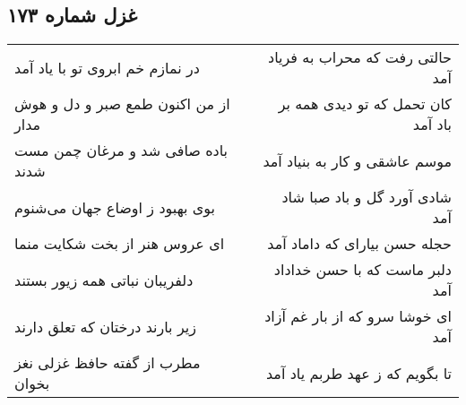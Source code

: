 \begin{center}
\section*{غزل شماره ۱۷۳}
\label{sec:sh173}
\begin{longtable}{l p{0.5cm} r}
در نمازم خم ابروی تو با یاد آمد
&&
حالتی رفت که محراب به فریاد آمد
\\
از من اکنون طمع صبر و دل و هوش مدار
&&
کان تحمل که تو دیدی همه بر باد آمد
\\
باده صافی شد و مرغان چمن مست شدند
&&
موسم عاشقی و کار به بنیاد آمد
\\
بوی بهبود ز اوضاع جهان می‌شنوم
&&
شادی آورد گل و باد صبا شاد آمد
\\
ای عروس هنر از بخت شکایت منما
&&
حجله حسن بیارای که داماد آمد
\\
دلفریبان نباتی همه زیور بستند
&&
دلبر ماست که با حسن خداداد آمد
\\
زیر بارند درختان که تعلق دارند
&&
ای خوشا سرو که از بار غم آزاد آمد
\\
مطرب از گفته حافظ غزلی نغز بخوان
&&
تا بگویم که ز عهد طربم یاد آمد
\\
\end{longtable}
\end{center}
